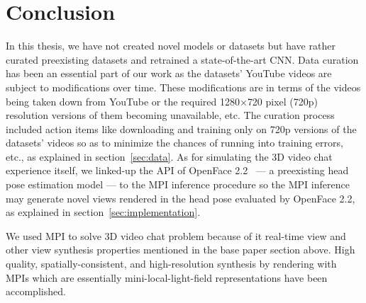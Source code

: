 \section{Conclusion}\label{sec:conclusion}


In this thesis, we have not created novel models or datasets but have rather curated preexisting datasets and retrained a state-of-the-art CNN. Data curation has been an essential part of our work as the datasets' YouTube videos are subject to modifications over time. These modifications are in terms of the videos being taken down from YouTube or the required 1280$\times$720 pixel (720p) resolution versions of them becoming unavailable, etc. The curation process included action items like downloading and training only on 720p versions of the datasets' videos so as to minimize the chances of running into training errors, etc., as explained in section~\ref{sec:data}. As for simulating the 3D video chat experience itself, we linked-up the API of OpenFace 2.2~\cite{baltrusaitis_openface_2018} --- a preexisting head pose estimation model --- to the MPI inference procedure so the MPI inference may generate novel views rendered in the head pose evaluated by OpenFace 2.2, as explained in section~\ref{sec:implementation}.

We used MPI to solve 3D video chat problem because of it real-time view and other view synthesis properties mentioned in the base paper section above. High quality, spatially-consistent, and high-resolution synthesis by rendering with MPIs which are essentially mini-local-light-field representations have been accomplished.
